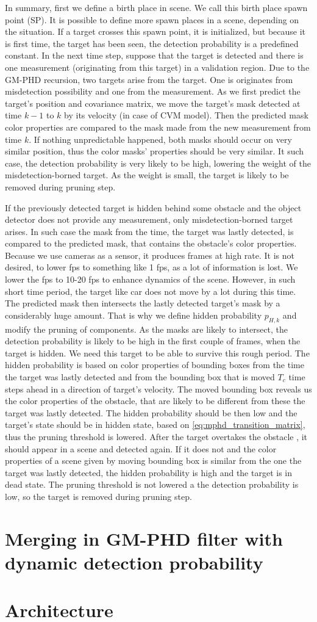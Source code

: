 In summary, first we define a birth place in scene. We call this birth place spawn point (SP). It is possible to
define more spawn places in a scene, depending on the situation. If a target crosses this spawn point, it is initialized, but because it is first time, the target has been seen, the detection probability is a predefined constant. In the
next time step, suppose that the target is detected and there is one measurement (originating from this target) in a
validation region. Due to the GM-PHD recursion, two targets arise from the target. One is originates from
misdetection possibility and one from the measurement. As we first predict the target's position and covariance
matrix, we move the target's mask detected at time $k-1$ to $k$ by its velocity (in case of CVM model). Then the
predicted mask color properties are compared to the mask made from the new measurement from time $k$. If nothing
unpredictable happened, both masks should occur on very similar position, thus the color masks' properties should be
very similar. It such case, the detection probability is very likely to be high, lowering the weight of the
misdetection-borned target. As the weight is small, the target is likely to be removed during pruning step.

If the previously detected target is hidden behind some obstacle and the object detector does not provide any
measurement, only misdetection-borned target arises. In such case the mask from the time, the target was lastly
detected, is compared to the predicted mask, that contains the obstacle's color properties. Because we use cameras as
a sensor, it produces frames at high rate. It is not desired, to lower fps to something like 1 fps, as a lot of
information is lost. We lower the fps to 10-20 fps to enhance dynamics of the scene. However, in such short time
period, the target like car does not move by a lot during this time. The predicted mask then intersects the lastly
detected target's mask by a considerably huge amount. That is why we define hidden probability $p_{H,k}$ and modify
the pruning of components. As the masks are likely to intersect, the detection probability is likely to be high in
the first couple of frames, when the target is hidden. We need this target to be able to survive this rough period.
The hidden probability is based on color properties of bounding boxes from the time the target was lastly detected
and from the bounding box that is moved $T_c$ time steps ahead in a direction of target's velocity. The moved
bounding box reveals us the color properties of the obstacle, that are likely to be different from these the target
was lastly detected. The hidden probability should be then low and the target's state should be in hidden state,
based on \ref{eq:mphd_transition_matrix}, thus the pruning threshold is lowered. After the target overtakes the obstacle
, it should appear in a scene and detected again. If it does not and the color properties of a scene given by moving
bounding box is similar from the one the target was lastly detected, the hidden probability is high and the target is
in dead state. The pruning threshold is not lowered a the detection probability is low, so the target is removed
during pruning step.
\section{Merging in GM-PHD filter with dynamic detection probability}
\section{Architecture}